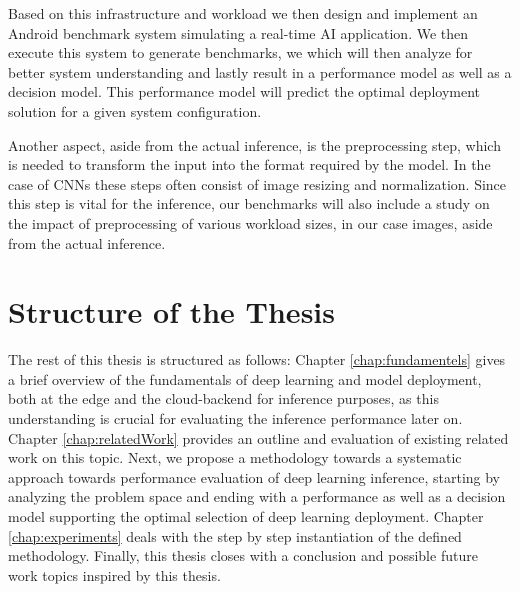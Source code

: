 Based on this infrastructure and workload we then design and implement an Android benchmark system simulating a real-time AI application.
We then execute this system to generate benchmarks, we which will then analyze for better system understanding and lastly result in a performance model as well as a decision model.
This performance model will predict the optimal deployment solution for a given system configuration.

Another aspect, aside from the actual inference, is the preprocessing step, which is needed to transform the input into the format required by the model. 
In the case of CNNs these steps often consist of image resizing and normalization.
Since this step is vital for the inference, our benchmarks will also include a study on the impact of preprocessing of various workload sizes, in our case images, aside from the actual inference.

\section{Structure of the Thesis}
The rest of this thesis is structured as follows: 
Chapter \ref{chap:fundamentels} gives a brief overview of the fundamentals of deep learning and model deployment, both at the edge and the cloud-backend for inference purposes, as this understanding is crucial for evaluating the inference performance later on.
Chapter \ref{chap:relatedWork} provides an outline and evaluation of existing related work on this topic. 
Next, we propose a methodology towards a systematic approach towards performance evaluation of deep learning inference, starting by analyzing the problem space and ending with a performance as well as a decision model supporting the optimal selection of deep learning deployment.
Chapter \ref{chap:experiments} deals with the step by step instantiation of the defined methodology.
Finally, this thesis closes with a conclusion and possible future work topics inspired by this thesis.
